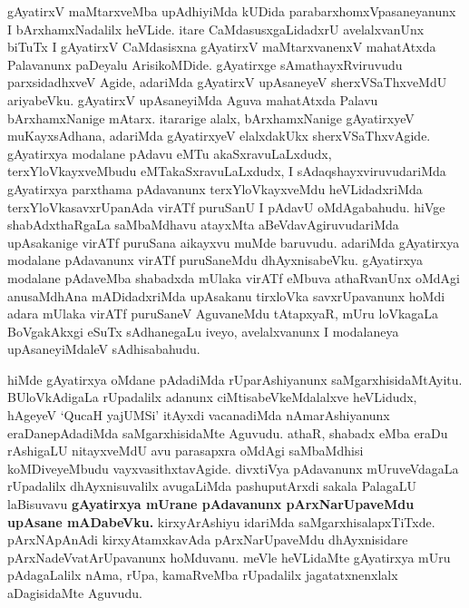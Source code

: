\begin{artha}
gAyatirxV maMtarxveMba upAdhiyiMda kUDida parabarxhomxVpasaneyanunx I bArxhamxNadalilx heVLide. itare CaMdasusxgaLidadxrU avelalxvanUnx biTuTx  I gAyatirxV CaMdasisxna gAyatirxV maMtarxvanenxV mahatAtxda Palavanunx paDeyalu ArisikoMDide. gAyatirxge sAmathayxRviruvudu parxsidadhxveV Agide, adariMda gAyatirxV upAsaneyeV sherxVSaThxveMdU ariyabeVku. gAyatirxV upAsaneyiMda Aguva mahatAtxda Palavu bArxhamxNanige mAtarx. itararige alalx, bArxhamxNanige gAyatirxyeV muKayxsAdhana, adariMda gAyatirxyeV elalxdakUkx sherxVSaThxvAgide. gAyatirxya modalane pAdavu eMTu akaSxravuLaLxdudx, terxYloVkayxveMbudu eMTakaSxravuLaLxdudx, I sAdaqshayxviruvudariMda gAyatirxya parxthama pAdavanunx terxYloVkayxveMdu heVLidadxriMda terxYloVkasavxrUpanAda virATf puruSanU I pAdavU oMdAgabahudu. hiVge shabAdxthaRgaLa saMbaMdhavu atayxMta aBeVdavAgiruvudariMda upAsakanige virATf puruSana aikayxvu muMde baruvudu. adariMda gAyatirxya modalane pAdavanunx virATf puruSaneMdu dhAyxnisabeVku. gAyatirxya modalane pAdaveMba shabadxda mUlaka virATf eMbuva athaRvanUnx oMdAgi anusaMdhAna mADidadxriMda upAsakanu tirxloVka savxrUpavanunx hoMdi adara mUlaka virATf puruSaneV AguvaneMdu tAtapxyaR, mUru loVkagaLa BoVgakAkxgi eSuTx sAdhanegaLu iveyo, avelalxvanunx I modalaneya upAsaneyiMdaleV sAdhisabahudu.
\end{artha}


\begin{artha}
hiMde gAyatirxya oMdane pAdadiMda rUparAshiyanunx saMgarxhisi\break daMtAyitu. BUloVkAdigaLa rUpadalilx adanunx ciMtisabeVkeMdalalxve heVLidudx, hAgeyeV `QucaH yajUMSi' itAyxdi vacanadiMda nAmarAshiyanunx eraDanepAdadiMda saMgarxhisidaMte Aguvudu. athaR, shabadx eMba eraDu rAshigaLU nitayxveMdU avu parasapxra oMdAgi saMbaMdhisi koMDiveyeMbudu vayxvasithxtavAgide. divxtiVya pAdavanunx mUruveVdagaLa rUpadalilx dhAyxnisuvalilx avugaLiMda pashuputArxdi sakala PalagaLU laBisuvavu \textbf{gAyatirxya mUrane pAdavanunx pArxNarUpaveMdu upAsane mADabeVku.} kirxyArAshiyu idariMda saMgarxhisalapxTiTxde. pArxNApAnAdi kirxyAtamxkavAda pArxNarUpaveMdu dhAyxnisidare pArxNadeVvatArUpavanunx hoMduvanu. meVle heVLidaMte gAyatirxya mUru pAdagaLalilx nAma, rUpa, kamaRveMba rUpadalilx jagatatxnenxlalx aDagisidaMte Aguvudu.
\end{artha}



